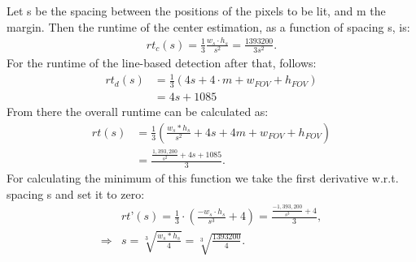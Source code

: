 \documentclass[journal,final,a4paper,twoside]{PS}
\begin{document}
Let s be the spacing between the positions of the pixels to be lit, and m the margin. Then the runtime of the center estimation, as a function of spacing s, is:
\begin{align}
rt_c (s) =\frac{1}{3} \frac{w_s\cdot h_s}{ s^2} =\frac{1393200}{3s^2} .
\end{align}
For the runtime of the line-based detection after that, follows:
\begin{align}
rt_d (s) &=\frac{1}{3}\left( 4s + 4\cdot m + w_{FOV} + h_{FOV}\right)\\& = 4s + 1085
\end{align}
From there the overall runtime can be calculated as:
\begin{align}
rt(s) &=\frac{1}{3}\left(\frac{w_s*h_s}{s^2} + 4s + 4m + w_{FOV} + h_{FOV}\right)\\& = \frac{\frac{1,393,200}{s^2} + 4s +1085}{3}.
\end{align}
For calculating the minimum of this function we take the first derivative w.r.t. spacing s and set it to zero:
\begin{align}
&rt’(s) = \frac{1}{3} \cdot \left( \frac{-w_s \cdot h_s}{s^3 }  + 4\right) = \frac{ \frac{-1,393,200}{s^3}+ 4}{3},\\
\Rightarrow &s = \sqrt[3]{\frac{w_s * h_s}{4}} = \sqrt[3]{\frac{1393200}{4}}. 
\end{align}
\end{document}
